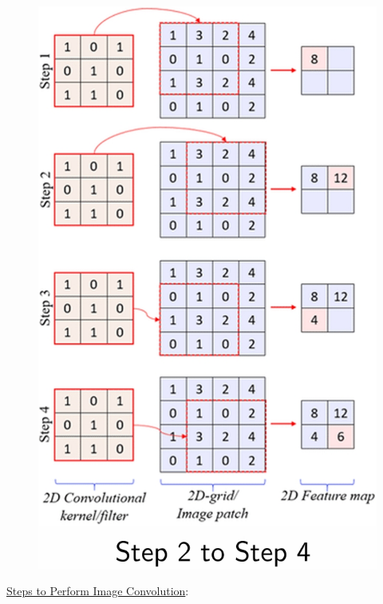 \documentclass{book}
\begin{document}
\begin{figure}
    \includegraphics[scale=0.17]{chapter 8/ch8_figure8.jpeg}
\end{figure}
\uline{Steps to Perform Image Convolution}:\\
\end{document}
